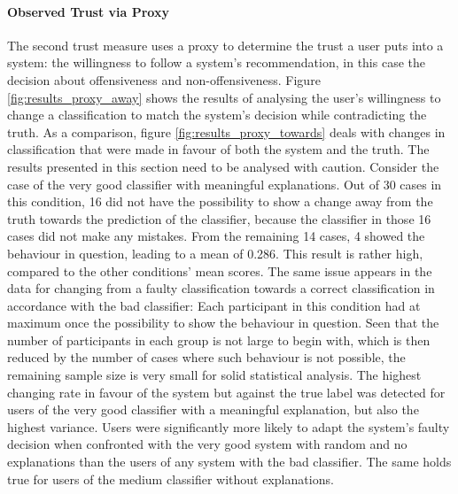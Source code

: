 \paragraph{Observed Trust via Proxy}
The second trust measure uses a proxy to determine the trust a user puts into a system: the willingness to follow a system's recommendation, in this case the decision about offensiveness and non-offensiveness. Figure \ref{fig:results_proxy_away} shows the results of analysing the user's willingness to change a classification to match the system's decision while contradicting the truth. As a comparison, figure \ref{fig:results_proxy_towards} deals with changes in classification that were made in favour of both the system and the truth.\newline
The results presented in this section need to be analysed with caution. Consider the case of the very good classifier with meaningful explanations. Out of 30 cases in this condition, 16 did not have the possibility to show a change away from the truth towards the prediction of the classifier, because the classifier in those 16 cases did not make any mistakes. From the remaining 14 cases, 4 showed the behaviour in question, leading to a mean of 0.286. This result is rather high, compared to the other conditions' mean scores. The same issue appears in the data for changing from a faulty classification towards a correct classification in accordance with the bad classifier: Each participant in this condition had at maximum once the possibility to show the behaviour in question. Seen that the number of participants in each group is not large to begin with, which is then reduced by the number of cases where such behaviour is not possible, the remaining sample size is very small for solid statistical analysis.\newline
The highest changing rate in favour of the system but against the true label was detected for users of the very good classifier with a meaningful explanation, but also the highest variance. Users were significantly more likely to adapt the system's faulty decision when confronted with the very good system with random and no explanations than the users of any system with the bad classifier. The same holds true for users of the medium classifier without explanations.\newline
